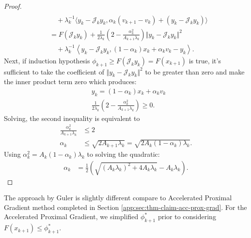 \documentclass[12pt]{article}
\begin{document}
\begin{proof}
\begin{align*}
                \\
                    &\quad 
                    + 
                    \lambda_k^{-1}
                    \langle
                        y_k - \mathcal J_k y_k,
                        \alpha_k(v_{k + 1} - v_k) + (y_k - \mathcal J_k y_k)
                    \rangle
                \\
                &= 
                F(\mathcal J_k y_k)
                + 
                \frac{1}{2\lambda_k}
                \left(
                    2 - \frac{\alpha_k^2}{A_{k + 1}\lambda_k}
                \right)
                \Vert y_k - \mathcal J_ky_k\Vert^2
                \\
                    & \quad 
                    + 
                    \lambda_k^{-1}
                    \left\langle 
                        y_k - \mathcal J_k y_k, 
                        (1 - \alpha_k)x_k + \alpha_k v_k - y_k
                    \right\rangle. 
            \end{align*}
            Next, if induction hypothesis $\phi_{k + 1}\ge F(\mathcal J_k y_k) = F(x_{k + 1})$ is true, it's sufficient to take the coefficient of $\Vert y_k - \mathcal J_k y_k\Vert^2$ to be greater than zero and make the inner product term zero which produces: 
            \begin{align*}
                & 
                y_k = (1 - \alpha_k)x_k + \alpha_k v_k
                \\
                &
                \frac{1}{2\lambda_k}
                \left(
                    2 - \frac{\alpha_k^2}{A_{k + 1}\lambda_k}
                \right) 
                \ge 0.
            \end{align*}
            Solving, the second inequality is equivalent to
            \begin{align*}
                \frac{\alpha_k^2}{A_{k + 1}\lambda_k} 
                & 
                \le 2
                \\
                \alpha_k
                & 
                \le
                \sqrt{2A_{k + 1}\lambda_k}
                = \sqrt{2A_k(1 - \alpha_k)\lambda_k}. 
            \end{align*}
            Using $\alpha_k^2 = A_k(1 - \alpha_k)\lambda_k$ to solving the quadratic: 
            \begin{align*}
                \alpha_k
                &= 
                \frac{1}{2}\left(
                    \sqrt{(A_k\lambda_k)^2 + 4A_k \lambda_k}
                    - A_k\lambda_k
                \right). 
            \end{align*}
        \end{proof}
        \begin{remark}
            The approach by Guler is slightly different compare to Accelerated Proximal Gradient method completed in Section \ref*{app:sec:thm-claim-acc-prox-grad}. 
            For the Accelerated Proximal Gradient, we simplified $\phi_{k + 1}^*$ prior to considering $F(x_{k + 1}) \le \phi_{k + 1}^*$. 
        \end{remark}
\end{document}
